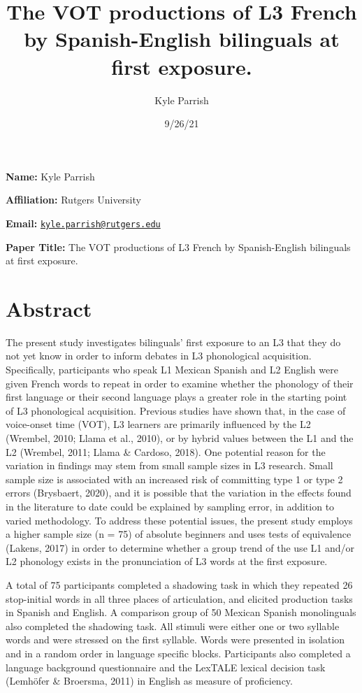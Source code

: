 \documentclass[
  12pt,
]{article}
\title{The VOT productions of L3 French by Spanish-English bilinguals at
first exposure.}
\author{Kyle Parrish}
\date{9/26/21}
\begin{document}
\maketitle

\textbf{Name:} Kyle Parrish

\textbf{Affiliation:} Rutgers University

\textbf{Email:}
\href{mailto:kyle.parrish@rutgers.edu}{\nolinkurl{kyle.parrish@rutgers.edu}}

\textbf{Paper Title:} The VOT productions of L3 French by
Spanish-English bilinguals at first exposure.

\newpage

\hypertarget{abstract}{%
\section{Abstract}\label{abstract}}

The present study investigates bilinguals' first exposure to an L3 that
they do not yet know in order to inform debates in L3 phonological
acquisition. Specifically, participants who speak L1 Mexican Spanish and
L2 English were given French words to repeat in order to examine whether
the phonology of their first language or their second language plays a
greater role in the starting point of L3 phonological acquisition.
Previous studies have shown that, in the case of voice-onset time (VOT),
L3 learners are primarily influenced by the L2 (Wrembel, 2010; Llama et
al., 2010), or by hybrid values between the L1 and the L2 (Wrembel,
2011; Llama \& Cardoso, 2018). One potential reason for the variation in
findings may stem from small sample sizes in L3 research. Small sample
size is associated with an increased risk of committing type 1 or type 2
errors (Brysbaert, 2020), and it is possible that the variation in the
effects found in the literature to date could be explained by sampling
error, in addition to varied methodology. To address these potential
issues, the present study employs a higher sample size (n = 75) of
absolute beginners and uses tests of equivalence (Lakens, 2017) in order
to determine whether a group trend of the use L1 and/or L2 phonology
exists in the pronunciation of L3 words at the first exposure.

A total of 75 participants completed a shadowing task in which they
repeated 26 stop-initial words in all three places of articulation, and
elicited production tasks in Spanish and English. A comparison group of
50 Mexican Spanish monolinguals also completed the shadowing task. All
stimuli were either one or two syllable words and were stressed on the
first syllable. Words were presented in isolation and in a random order
in language specific blocks. Participants also completed a language
background questionnaire and the LexTALE lexical decision task (Lemhöfer
\& Broersma, 2011) in English as measure of proficiency.
\end{document}
